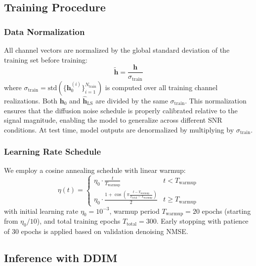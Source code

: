 \documentclass[conference]{IEEEtran}
\begin{document}
\subsection{Training Procedure}

\subsubsection{Data Normalization}

All channel vectors are normalized by the global standard deviation of the training set before training:
\begin{equation}
\tilde{\mathbf{h}} = \frac{\mathbf{h}}{\sigma_{\text{train}}}
\end{equation}
where $\sigma_{\text{train}} = \text{std}(\{\mathbf{h}_0^{(i)}\}_{i=1}^{N_{\text{train}}})$ is computed over all training channel realizations. Both $\mathbf{h}_0$ and $\hat{\mathbf{h}}_{\text{LS}}$ are divided by the same $\sigma_{\text{train}}$. This normalization ensures that the diffusion noise schedule is properly calibrated relative to the signal magnitude, enabling the model to generalize across different SNR conditions. At test time, model outputs are denormalized by multiplying by $\sigma_{\text{train}}$.

\subsubsection{Learning Rate Schedule}

We employ a cosine annealing schedule with linear warmup:
\begin{equation}
\eta(t) = \begin{cases}
\eta_0 \cdot \frac{t}{T_{\text{warmup}}} & t < T_{\text{warmup}} \\
\eta_0 \cdot \frac{1 + \cos\left(\pi \frac{t - T_{\text{warmup}}}{T_{\text{total}} - T_{\text{warmup}}}\right)}{2} & t \geq T_{\text{warmup}}
\end{cases}
\end{equation}
with initial learning rate $\eta_0 = 10^{-3}$, warmup period $T_{\text{warmup}} = 20$ epochs (starting from $\eta_0/10$), and total training epochs $T_{\text{total}} = 300$. Early stopping with patience of 30 epochs is applied based on validation denoising NMSE.

\subsection{Inference with DDIM}
\end{document}
